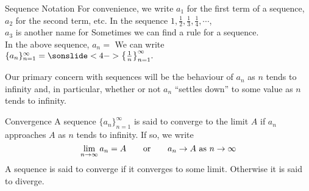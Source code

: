 \begin{frame}{Sequence Notation}
For convenience, we write $a_1$ for the first term of a sequence, $a_2$ for the second term, etc.
\vfill
In the sequence $1,\frac{1}{2},\frac{1}{3},\frac14,\cdots$, \\
$a_3$ is another name for  
\vfill
Sometimes we can find a rule for a sequence.\\ 
In the above sequence, $a_n=$
\vfill
We can write $\{a_n\}_{n=1}^\infty =\sonslide<4->{{ \left\{ \frac1n\right\}}_{n=1}^\infty.}$
\end{frame}

\begin{frame}
Our primary concern with sequences will be the behaviour of $a_n$ as $n$
tends to infinity and, in particular, whether or not $a_n$ ``settles down''
to some value as $n$ tends to infinity.
\begin{block}{Convergence}
A sequence $\big\{a_n\big\}_{n=1}^\infty$ is said to \alert{converge} to the limit
$A$ if $a_n$ approaches $A$ as $n$ tends to infinity. If so, we write
\begin{equation*}
\lim_{n\rightarrow\infty} a_n=A\qquad\hbox{or}\qquad
a_n\rightarrow A\text{ as }n\rightarrow\infty
\end{equation*}
A sequence is said to converge if it converges to some limit. Otherwise
it is said to diverge.
\end{block}
\end{frame}
